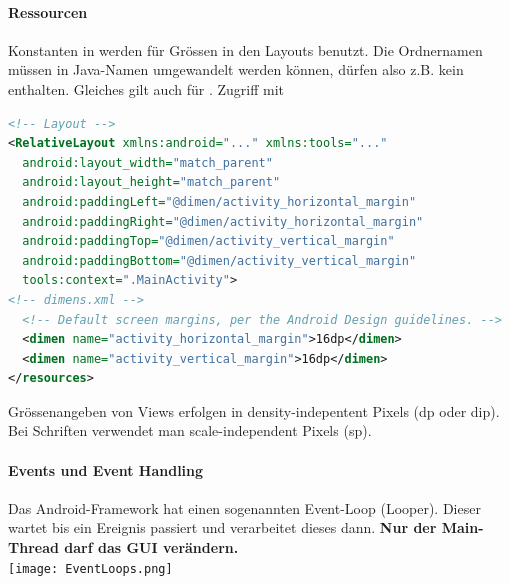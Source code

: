 \paragraph{Ressourcen} Konstanten in  werden für Grössen in den Layouts benutzt.
Die Ordnernamen müssen in Java-Namen umgewandelt werden können, dürfen also z.B. kein \code{-} enthalten. Gleiches gilt auch für  . Zugriff mit   

\begin{lstlisting}[language=xml]
<!-- Layout -->
<RelativeLayout xmlns:android="..." xmlns:tools="..."
  android:layout_width="match_parent"
  android:layout_height="match_parent"
  android:paddingLeft="@dimen/activity_horizontal_margin"
  android:paddingRight="@dimen/activity_horizontal_margin"
  android:paddingTop="@dimen/activity_vertical_margin"
  android:paddingBottom="@dimen/activity_vertical_margin"
  tools:context=".MainActivity">
<!-- dimens.xml -->
  <!-- Default screen margins, per the Android Design guidelines. -->
  <dimen name="activity_horizontal_margin">16dp</dimen>
  <dimen name="activity_vertical_margin">16dp</dimen>
</resources>
\end{lstlisting}
Grössenangeben von Views erfolgen in density-indepentent Pixels (dp oder dip). Bei Schriften verwendet man scale-independent Pixels (sp).
\paragraph{Events und Event Handling}\label{grundlagen:eventhandling} Das Android-Framework hat einen sogenannten Event-Loop (Looper). Dieser wartet bis ein Ereignis passiert und verarbeitet dieses dann. \textbf{Nur der Main-Thread darf das GUI verändern.} \\
\texttt{[image: EventLoops.png]} \\

